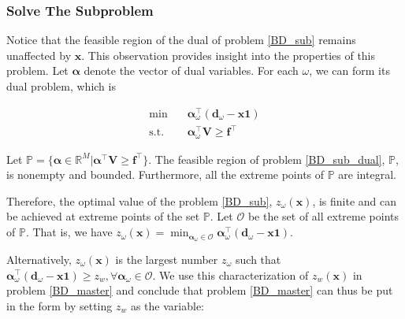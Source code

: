 \subsubsection{Solve The Subproblem}\label{second_stage}

Notice that the feasible region of the dual of problem \eqref{BD_sub} remains unaffected by $\mathbf{x}$. This observation provides insight into the properties of this problem. Let $\bm{\alpha}$ denote the vector of dual variables. For each $\omega$, we can form its dual problem, which is 

\begin{equation}\label{BD_sub_dual}
  \begin{aligned}
    \min \quad & \bm{\alpha}_{\omega}^{\intercal} (\mathbf{d}_{\omega}- \mathbf{x} \mathbf{1}) \\
    \text {s.t.} \quad & \bm{\alpha}_{\omega}^{\intercal} \mathbf{V} \geq \mathbf{f}^{\intercal}
  \end{aligned}
\end{equation}

\begin{lem}\label{feasible_region}
Let $\mathbb{P} = \{\bm{\alpha} \in \mathbb{R}^{M}|\bm{\alpha}^{\intercal} \mathbf{V} \geq \mathbf{f}^{\intercal}\}$. The feasible region of problem \eqref{BD_sub_dual}, $\mathbb{P}$, is nonempty and bounded. Furthermore, all the extreme points of $\mathbb{P}$ are integral.
\end{lem}

Therefore, the optimal value of the problem \eqref{BD_sub}, $z_{\omega}(\mathbf{x})$, is finite and can be achieved at extreme points of the set $\mathbb{P}$. Let $\mathcal{O}$ be the set of all extreme points of $\mathbb{P}$. That is, we have $z_{\omega}(\mathbf{x}) = \min_{\bm{\alpha}_{\omega} \in \mathcal{O}} \bm{\alpha}_{\omega}^{\intercal}(\mathbf{d}_{\omega}- \mathbf{x} \mathbf{1})$.



Alternatively, $z_{\omega}(\mathbf{x})$ is the largest number $z_{\omega}$ such that $\bm{\alpha}_{\omega}^{\intercal}(\mathbf{d}_{\omega}- \mathbf{x} \mathbf{1}) \geq z_w, \forall \bm{\alpha}_{\omega} \in \mathcal{O}$. We use this characterization of $z_w(\mathbf{x})$ in problem \eqref{BD_master} and conclude that problem \eqref{BD_master} can thus be put in the form by setting $z_w$ as the variable:

